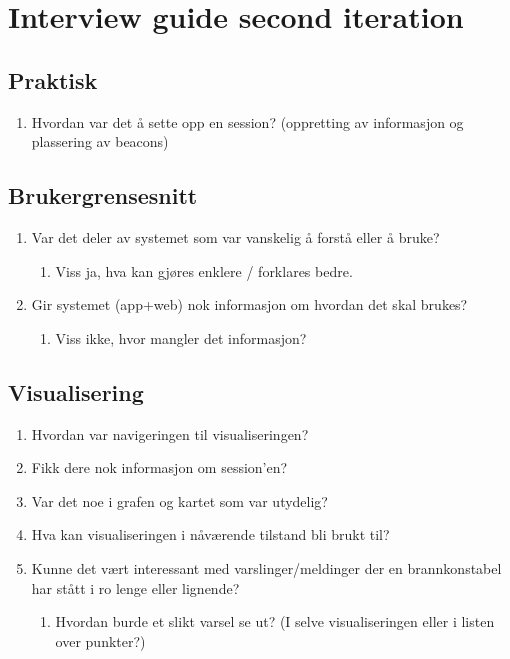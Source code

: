 \documentclass[../Main/thesis.tex]{subfiles}
\begin{document}
\chapter{Interview guide second iteration}
\label{app:interview-guide-second}
\section*{Praktisk}
\begin{enumerate}
	\item Hvordan var det å sette opp en session? (oppretting av informasjon og plassering av beacons)
\end{enumerate}
\section*{Brukergrensesnitt}

\begin{enumerate}
	\item Var det deler av systemet som var vanskelig å forstå eller å bruke?
\begin{enumerate}
	\item Viss ja, hva kan gjøres enklere / forklares bedre.
\end{enumerate}
	\item Gir systemet (app+web) nok informasjon om hvordan det skal brukes?
\begin{enumerate}
	\item Viss ikke, hvor mangler det informasjon?
\end{enumerate}
\end{enumerate}

\section*{Visualisering}
\begin{enumerate}
	\item Hvordan var navigeringen til visualiseringen?
	\item Fikk dere nok informasjon om session’en?
	\item Var det noe i grafen og kartet som var utydelig?
	\item Hva kan visualiseringen i nåværende tilstand bli brukt til?
	\item Kunne det vært interessant med varslinger/meldinger der en brannkonstabel har stått i ro lenge eller lignende?
\begin{enumerate}
	\item Hvordan burde et slikt varsel se ut? (I selve visualiseringen eller i listen over punkter?)
\end{enumerate}
\end{enumerate}
\end{document}
